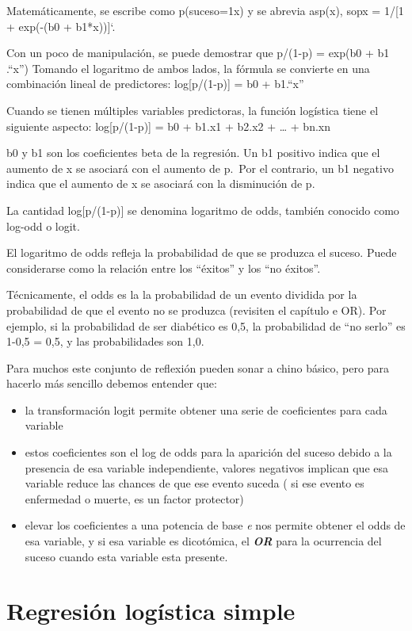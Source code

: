 \documentclass[
]{book}
\begin{document}
Matemáticamente, se escribe como p(suceso=1\textbar x) y se abrevia asp(x), sopx = 1/{[}1 + exp(-(b0 + b1*x)){]}`.

Con un poco de manipulación, se puede demostrar que p/(1-p) = exp(b0 + b1 .``x'') Tomando el logaritmo de ambos lados, la fórmula se convierte en una combinación lineal de predictores: log{[}p/(1-p){]} = b0 + b1.``x''

Cuando se tienen múltiples variables predictoras, la función logística tiene el siguiente aspecto: log{[}p/(1-p){]} = b0 + b1.x1 + b2.x2 + \ldots{} + bn.xn

b0 y b1 son los coeficientes beta de la regresión. Un b1 positivo indica que el aumento de x se asociará con el aumento de p.~Por el contrario, un b1 negativo indica que el aumento de x se asociará con la disminución de p.

La cantidad log{[}p/(1-p){]} se denomina logaritmo de odds, también conocido como log-odd o logit.

El logaritmo de odds refleja la probabilidad de que se produzca el suceso. Puede considerarse como la relación entre los ``éxitos'' y los ``no éxitos''.

Técnicamente, el odds es la la probabilidad de un evento dividida por la probabilidad de que el evento no se produzca (revisiten el capítulo e OR). Por ejemplo, si la probabilidad de ser diabético es 0,5, la probabilidad de ``no serlo'' es 1-0,5 = 0,5, y las probabilidades son 1,0.

Para muchos este conjunto de reflexión pueden sonar a chino básico, pero para hacerlo más sencillo debemos entender que:

\begin{itemize}
\item
  la transformación logit permite obtener una serie de coeficientes para cada variable
\item
  estos coeficientes son el log de odds para la aparición del suceso debido a la presencia de esa variable independiente, valores negativos implican que esa variable reduce las chances de que ese evento suceda ( si ese evento es enfermedad o muerte, es un factor protector)
\item
  elevar los coeficientes a una potencia de base \emph{e} nos permite obtener el odds de esa variable, y si esa variable es dicotómica, el \textbf{\emph{OR}} para la ocurrencia del suceso cuando esta variable esta presente.
\end{itemize}

\hypertarget{regresiuxf3n-loguxedstica-simple}{%
\section{Regresión logística simple}\label{regresiuxf3n-loguxedstica-simple}}
\end{document}
